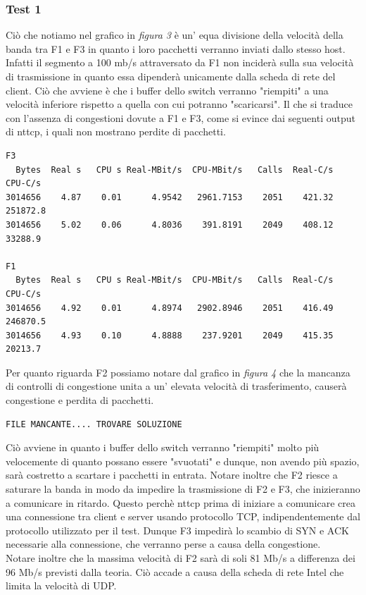 \documentclass[12pt]{article}
\begin{document}
\subsubsection{Test 1}
Ciò che notiamo nel grafico in \textit{figura 3} è un' equa divisione della velocità della banda tra F1 e F3 in quanto i loro pacchetti verranno inviati dallo stesso host. 
Infatti il segmento a 100 mb/s attraversato da F1 non inciderà sulla sua velocità di trasmissione in quanto essa dipenderà unicamente dalla scheda di rete del client. Ciò che avviene è che i buffer dello switch verranno "riempiti" a una velocità inferiore rispetto a quella con cui potranno "scaricarsi". Il che si traduce con l'assenza di congestioni dovute a F1 e F3, come si evince dai seguenti output di nttcp, i quali non mostrano perdite di pacchetti.
\begin{verbatim}
F3
  Bytes  Real s   CPU s Real-MBit/s  CPU-MBit/s   Calls  Real-C/s   CPU-C/s
3014656    4.87    0.01      4.9542   2961.7153    2051    421.32  251872.8
3014656    5.02    0.06      4.8036    391.8191    2049    408.12   33288.9

F1
  Bytes  Real s   CPU s Real-MBit/s  CPU-MBit/s   Calls  Real-C/s   CPU-C/s
3014656    4.92    0.01      4.8974   2902.8946    2051    416.49  246870.5
3014656    4.93    0.10      4.8888    237.9201    2049    415.35   20213.7
\end{verbatim}
Per quanto riguarda F2 possiamo notare dal grafico in \textit{figura 4} che la mancanza di controlli di congestione unita a un' elevata velocità di trasferimento, causerà congestione e perdita di pacchetti.
\begin{verbatim}
FILE MANCANTE.... TROVARE SOLUZIONE
\end{verbatim}
Ciò avviene in quanto i buffer dello switch verranno "riempiti" molto più velocemente di quanto possano essere "svuotati" e  dunque, non avendo più spazio, sarà costretto a scartare i pacchetti in entrata.
Notare inoltre che F2 riesce a saturare la banda in modo da impedire la trasmissione di F2 e F3, che inizieranno a comunicare in ritardo. Questo perchè nttcp prima di iniziare a comunicare  crea una connessione tra client e server usando protocollo TCP, indipendentemente dal protocollo utilizzato per il test. Dunque F3 impedirà lo scambio di SYN e ACK necessarie alla connessione, che verranno perse a causa della congestione.\\
Notare inoltre che la massima velocità di F2 sarà di soli 81 Mb/s a differenza dei 96 Mb/s previsti dalla teoria.
Ciò accade a causa della scheda di rete Intel che limita la velocità di UDP.
\end{document}
